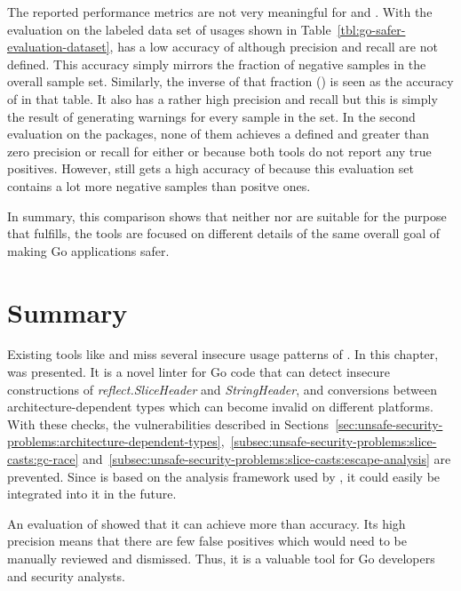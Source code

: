 The reported performance metrics are not very meaningful for \toolVet{} and \toolGosec{}.
With the evaluation on the labeled data set of \unsafe{} usages shown in Table~\ref{tbl:go-safer-evaluation-dataset},
\toolVet{} has a low accuracy of  although precision and recall are not defined.
This accuracy simply mirrors the fraction of negative samples in the overall sample set.
Similarly, the inverse of that fraction () is seen as the accuracy of \toolGosec{} in that table.
It also has a rather high precision and recall but this is simply the result of generating warnings for every sample in
the set.
In the second evaluation on the  packages, none of them achieves a defined and greater than zero precision
or recall for either \toolVet{} or \toolGosec{} because both tools do not report any true positives.
However, \toolVet{} still gets a high accuracy of  because this evaluation set contains a lot more
negative samples than positve ones.

In summary, this comparison shows that neither \toolVet{} nor \toolGosec{} are suitable for the purpose that
\toolSafer{} fulfills, the tools are focused on different details of the same overall goal of making Go applications
safer.



\section{Summary}\label{sec:go-safer:summary}

Existing tools like \toolVet{} and \toolGosec{} miss several insecure usage patterns of \unsafe{}.
In this chapter, \toolSafer{} was presented.
It is a novel linter for Go code that can detect insecure constructions of \textit{reflect.SliceHeader} and
\textit{StringHeader}, and conversions between architecture-dependent types which can become invalid on different
platforms.
With these checks, the vulnerabilities described in
Sections~\ref{sec:unsafe-security-problems:architecture-dependent-types},~\ref{subsec:unsafe-security-problems:slice-casts:gc-race}
and~\ref{subsec:unsafe-security-problems:slice-casts:escape-analysis} are prevented.
Since \toolSafer{} is based on the analysis framework used by \toolVet{}, it could easily be integrated into it in the
future.

An evaluation of \toolSafer{} showed that it can achieve more than  accuracy.
Its high precision means that there are few false positives which would need to be manually reviewed and dismissed.
Thus, it is a valuable tool for Go developers and security analysts.
